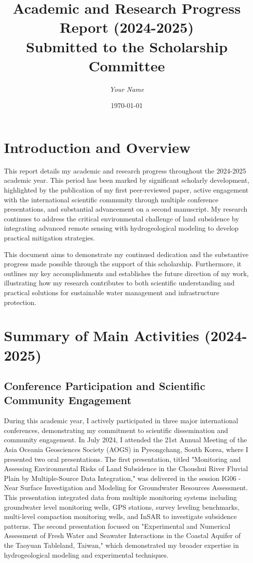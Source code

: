 \documentclass[12pt, a4paper]{article}
\title{
	\huge{\textbf{Academic and Research Progress Report (2024-2025)}} \\
	\vspace{1cm}
	\large{Submitted to the Scholarship Committee} \\
	\vspace{2cm}
}
\author{\textit{Your Name}}
\date{\today}
\begin{document}
	
	\maketitle
	\thispagestyle{empty}
	\newpage
	
	\tableofcontents
	\newpage
	
	\section{Introduction and Overview}
	
	This report details my academic and research progress throughout the 2024-2025 academic year. This period has been marked by significant scholarly development, highlighted by the publication of my first peer-reviewed paper, active engagement with the international scientific community through multiple conference presentations, and substantial advancement on a second manuscript. My research continues to address the critical environmental challenge of land subsidence by integrating advanced remote sensing with hydrogeological modeling to develop practical mitigation strategies.
	
	This document aims to demonstrate my continued dedication and the substantive progress made possible through the support of this scholarship. Furthermore, it outlines my key accomplishments and establishes the future direction of my work, illustrating how my research contributes to both scientific understanding and practical solutions for sustainable water management and infrastructure protection.
	
	\section{Summary of Main Activities (2024-2025)}
	
	\subsection{Conference Participation and Scientific Community Engagement}
	
	During this academic year, I actively participated in three major international conferences, demonstrating my commitment to scientific dissemination and community engagement. In July 2024, I attended the 21st Annual Meeting of the Asia Oceania Geosciences Society (AOGS) in Pyeongchang, South Korea, where I presented two oral presentations. The first presentation, titled "Monitoring and Assessing Environmental Risks of Land Subsidence in the Choushui River Fluvial Plain by Multiple-Source Data Integration," was delivered in the session IG06 - Near Surface Investigation and Modeling for Groundwater Resources Assessment. This presentation integrated data from multiple monitoring systems including groundwater level monitoring wells, GPS stations, survey leveling benchmarks, multi-level compaction monitoring wells, and InSAR to investigate subsidence patterns. The second presentation focused on "Experimental and Numerical Assessment of Fresh Water and Seawater Interactions in the Coastal Aquifer of the Taoyuan Tableland, Taiwan," which demonstrated my broader expertise in hydrogeological modeling and experimental techniques.
	
\end{document}
